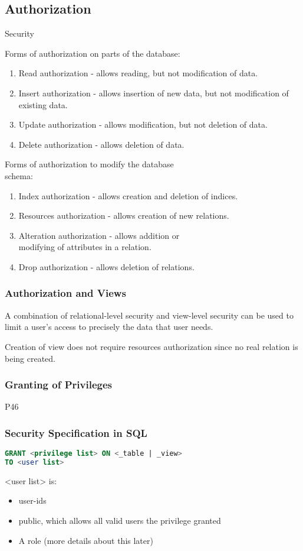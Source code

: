 \subsection{Authorization}
Security

Forms of authorization on parts of the database:
\begin{enumerate}
    \item Read authorization - allows reading, but not modification of data.
    \item Insert authorization - allows insertion of new data, but not modification of existing data.
    \item Update authorization - allows modification, but not deletion of data.
    \item Delete authorization - allows deletion of data.
\end{enumerate}


Forms of authorization to modify the database\\ schema:
\begin{enumerate}
    \item Index authorization - allows creation and deletion of indices.
    \item Resources authorization - allows creation of new relations.
    \item Alteration authorization - allows addition or\\ modifying of attributes in a relation.
    \item Drop authorization - allows deletion of relations.
\end{enumerate}

\subsubsection{Authorization and Views}
A combination of relational-level security and view-level security can be used to limit a user’s access to precisely the data that user needs.

Creation of view does not require resources authorization since no real relation is being created.

\subsubsection{Granting of Privileges}
P46

\subsubsection{Security Specification in SQL}
\begin{lstlisting}[language=sql,morekeywords={REFERENCES, WITH}]
GRANT <privilege list> ON <_table | _view>
TO <user list>
\end{lstlisting}
<user list> is:
\begin{itemize}
    \item user-ids
    \item public, which allows all valid users the privilege granted
    \item A role (more details about this later)
\end{itemize}


